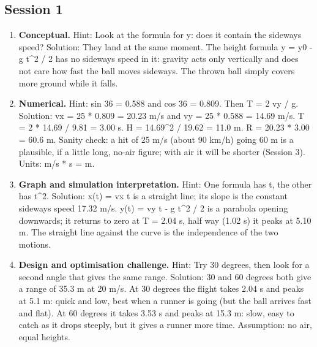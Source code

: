\documentclass[11pt,a4paper]{article}
\begin{document}
\subsection*{Session 1}
\begin{enumerate}[nosep]
\item \textbf{Conceptual.} Hint: Look at the formula for y: does it contain the sideways speed? Solution: They land at the same moment. The height formula y = y0 - g t\textasciicircum{}2 / 2 has no sideways speed in it: gravity acts only vertically and does not care how fast the ball moves sideways. The thrown ball simply covers more ground while it falls.
\item \textbf{Numerical.} Hint: sin 36 = 0.588 and cos 36 = 0.809. Then T = 2 vy / g. Solution: vx = 25 * 0.809 = 20.23 m/s and vy = 25 * 0.588 = 14.69 m/s. T = 2 * 14.69 / 9.81 = 3.00 s. H = 14.69\textasciicircum{}2 / 19.62 = 11.0 m. R = 20.23 * 3.00 = 60.6 m. Sanity check: a hit of 25 m/s (about 90 km/h) going 60 m is a plausible, if a little long, no-air figure; with air it will be shorter (Session 3). Units: m/s * s = m.
\item \textbf{Graph and simulation interpretation.} Hint: One formula has t, the other has t\textasciicircum{}2. Solution: x(t) = vx t is a straight line; its slope is the constant sideways speed 17.32 m/s. y(t) = vy t - g t\textasciicircum{}2 / 2 is a parabola opening downwards; it returns to zero at T = 2.04 s, half way (1.02 s) it peaks at 5.10 m. The straight line against the curve is the independence of the two motions.
\item \textbf{Design and optimisation challenge.} Hint: Try 30 degrees, then look for a second angle that gives the same range. Solution: 30 and 60 degrees both give a range of 35.3 m at 20 m/s. At 30 degrees the flight takes 2.04 s and peaks at 5.1 m: quick and low, best when a runner is going (but the ball arrives fast and flat). At 60 degrees it takes 3.53 s and peaks at 15.3 m: slow, easy to catch as it drops steeply, but it gives a runner more time. Assumption: no air, equal heights.
\end{enumerate}
\end{document}
